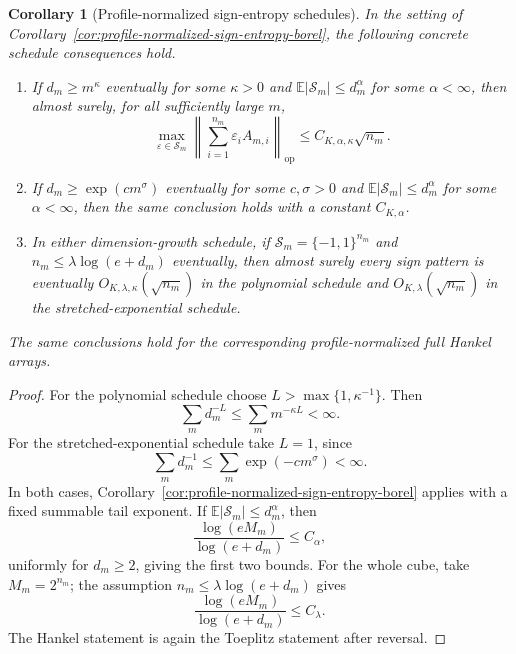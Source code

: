 \documentclass[11pt]{amsart}
\numberwithin{equation}{section}
\newtheorem{corollary}[theorem]{Corollary}
\theoremstyle{definition}
\theoremstyle{remark}
\newcommand{\op}{\mathrm{op}}
\newcommand{\Exp}{\mathbb E}
\newcommand{\norm}[1]{\left\lVert #1\right\rVert}
\newcommand{\abs}[1]{\left\lvert #1\right\rvert}
\newcommand{\eps}{\varepsilon}
\begin{document}
\begin{corollary}[Profile-normalized sign-entropy schedules]
\label{cor:profile-normalized-sign-entropy-schedules}
In the setting of Corollary~\ref{cor:profile-normalized-sign-entropy-borel},
the following concrete schedule consequences hold.

\begin{enumerate}[label=\textup{(\roman*)}]
\item If \(d_m\ge m^\kappa\) eventually for some \(\kappa>0\) and
\(\Exp\abs{\mathcal S_m}\le d_m^\alpha\) for some \(\alpha<\infty\), then
almost surely, for all sufficiently large \(m\),
\[
  \max_{\eps\in\mathcal S_m}
  \norm{\sum_{i=1}^{n_m}\eps_iA_{m,i}}_{\op}
  \le C_{K,\alpha,\kappa}\sqrt{n_m}.
\]
\item If \(d_m\ge \exp(c m^\sigma)\) eventually for some \(c,\sigma>0\) and
\(\Exp\abs{\mathcal S_m}\le d_m^\alpha\) for some \(\alpha<\infty\), then the
same conclusion holds with a constant \(C_{K,\alpha}\).
\item In either dimension-growth schedule, if
\(\mathcal S_m=\{-1,1\}^{n_m}\) and
\(n_m\le\lambda\log(e+d_m)\) eventually, then almost surely every sign pattern
is eventually \(O_{K,\lambda,\kappa}(\sqrt{n_m})\) in the polynomial schedule
and \(O_{K,\lambda}(\sqrt{n_m})\) in the stretched-exponential schedule.
\end{enumerate}
The same conclusions hold for the corresponding profile-normalized full Hankel
arrays.
\end{corollary}

\begin{proof}
For the polynomial schedule choose \(L>\max\{1,\kappa^{-1}\}\).  Then
\[
  \sum_m d_m^{-L}\le\sum_m m^{-\kappa L}<\infty .
\]
For the stretched-exponential schedule take \(L=1\), since
\[
  \sum_m d_m^{-1}\le\sum_m \exp(-c m^\sigma)<\infty .
\]
In both cases,
Corollary~\ref{cor:profile-normalized-sign-entropy-borel} applies with a fixed
summable tail exponent.  If \(\Exp\abs{\mathcal S_m}\le d_m^\alpha\), then
\[
  \frac{\log(eM_m)}{\log(e+d_m)}\le C_\alpha,
\]
uniformly for \(d_m\ge2\), giving the first two bounds.  For the whole cube,
take \(M_m=2^{n_m}\); the assumption \(n_m\le\lambda\log(e+d_m)\) gives
\[
  \frac{\log(eM_m)}{\log(e+d_m)}
  \le C_\lambda .
\]
The Hankel statement is again the Toeplitz statement after reversal.
\end{proof}
\end{document}

